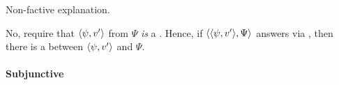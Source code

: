 \begin{note}
  Non-factive explanation.

  No,  require that \(\langle \psi, v' \rangle\) from \(\Psi\) \emph{is} a \fc{}.
  Hence, if \(\langle \langle \psi, v' \rangle, \Psi \rangle\) answers \qWhyV{} via \requ{}, then there is a \ros{} between \(\langle \psi, v' \rangle\) and \(\Psi\).
\end{note}

\paragraph{Subjunctive}












